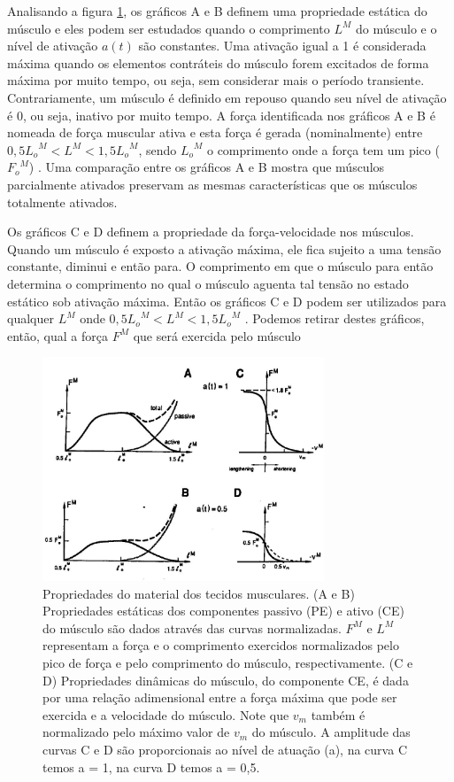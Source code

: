 Analisando a figura \ref{graficos_zajac}, os gráficos A e B definem uma propriedade estática do músculo e eles podem ser estudados quando o comprimento $L^M$ do músculo e o nível de ativação $a(t)$ são constantes. Uma ativação igual a 1 é considerada máxima quando os elementos contráteis do músculo forem excitados de forma máxima por muito tempo, ou seja, sem considerar mais o período transiente. Contrariamente, um músculo é definido em repouso quando seu nível de ativação é 0, ou seja, inativo por muito tempo. A força identificada nos gráficos A e B é nomeada de força muscular ativa e esta força é gerada (nominalmente) entre $0,5{L_o}^M < L^M < 1,5{L_o}^M$, sendo ${L_o}^M$ o comprimento onde a força tem um pico (${F_o}^M$) \cite{zajac1989muscle}. Uma comparação entre os gráficos A e B mostra que músculos parcialmente ativados preservam as mesmas características que os músculos totalmente ativados.

Os gráficos C e D definem a propriedade da força-velocidade nos músculos. Quando um músculo é exposto a ativação máxima, ele fica sujeito a uma tensão constante, diminui e então para. O comprimento em que o músculo para então determina o comprimento no qual o músculo aguenta tal tensão no estado estático sob ativação máxima. Então os gráficos C e D podem ser utilizados para qualquer $L^M$ onde $0,5{L_o}^M < L^M < 1,5{L_o}^M$ \cite{zajac1989muscle}. Podemos retirar destes gráficos, então, qual a força $F^M$ que será exercida pelo músculo 

\begin{figure}[H]
\centering
\includegraphics[width = 0.75\textwidth,angle=-90]{img/Zajac1989_Graficos.JPG}
\caption[Gráficos das propriedades força-comprimento e força-velocidade]{Propriedades do material dos tecidos musculares. (A e B) Propriedades estáticas
dos componentes passivo (PE) e ativo (CE) do músculo são dados através das curvas
normalizadas. $F^M$ e $L^M$ representam a força e o comprimento exercidos normalizados pelo
pico de força e pelo comprimento do músculo, respectivamente. (C e D) Propriedades
dinâmicas do músculo, do componente CE, é dada por uma relação adimensional entre
a força máxima que pode ser exercida e a velocidade do músculo. Note que $v_m$ também
é normalizado pelo máximo valor de $v_m$ do músculo. A amplitude das curvas C e D são
proporcionais ao nível de atuação (a), na curva C temos a = 1, na curva D temos a =
0,5.
\cite{zajac1989muscle}}
\label{graficos_zajac}
\end{figure}


